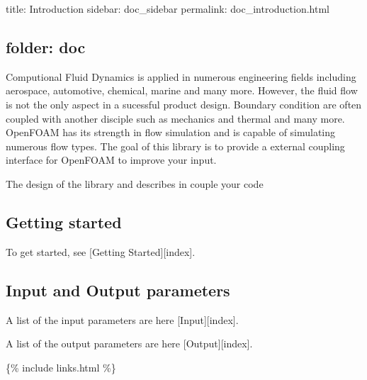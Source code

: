 

 title\+: Introduction sidebar\+: doc\+\_\+sidebar permalink\+: doc\+\_\+introduction.\+html \subsection*{folder\+: doc }

Computional Fluid Dynamics is applied in numerous engineering fields including aerospace, automotive, chemical, marine and many more. However, the fluid flow is not the only aspect in a sucessful product design. Boundary condition are often coupled with another disciple such as mechanics and thermal and many more. Open\+F\+O\+AM has its strength in flow simulation and is capable of simulating numerous flow types. The goal of this library is to provide a external coupling interface for Open\+F\+O\+AM to improve your input.

The design of the library and describes in couple your code

\subsection*{Getting started}

To get started, see \mbox{[}Getting Started\mbox{]}\mbox{[}index\mbox{]}.

\subsection*{Input and Output parameters}

A list of the input parameters are here \mbox{[}Input\mbox{]}\mbox{[}index\mbox{]}.

A list of the output parameters are here \mbox{[}Output\mbox{]}\mbox{[}index\mbox{]}.

\{\% include links.\+html \%\} 
